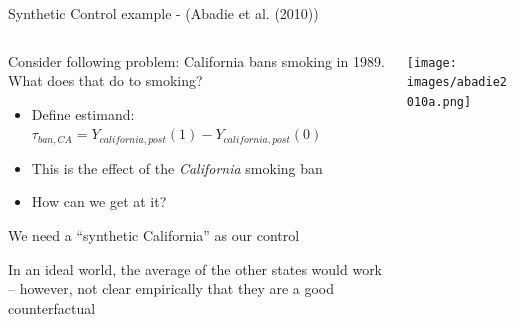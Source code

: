 \documentclass[notes,11pt, aspectratio=169]{beamer}
\newenvironment{wideitemize}{\itemize\addtolength{\itemsep}{10pt}}{\enditemize}
\begin{document}
\begin{frame}{Synthetic Control example - (Abadie et al. (2010)) }
  \begin{columns}[T] %
    \begin{column}{0.5\textwidth}
      \begin{wideitemize}
      \item Consider following problem: California bans smoking in 1989. What does that do to smoking?
        \begin{itemize}
        \item Define estimand: $\tau_{ban,CA} = Y_{california, post}(1) - Y_{california, post}(0)$
        \item This is the effect of the \emph{California} smoking ban 
        \item How can we get at it? 
        \end{itemize}
      \item We need a ``synthetic California'' as our control
      \item In an ideal world, the average of the other states would
        work -- however, not clear empirically that they are a good
        counterfactual
      \end{wideitemize}
    \end{column}%
    \hfill%
    \begin{column}{.5\textwidth}
      \texttt{[image: images/abadie2010a.png]}
    \end{column}%
  \end{columns}
\end{frame}
\end{document}
